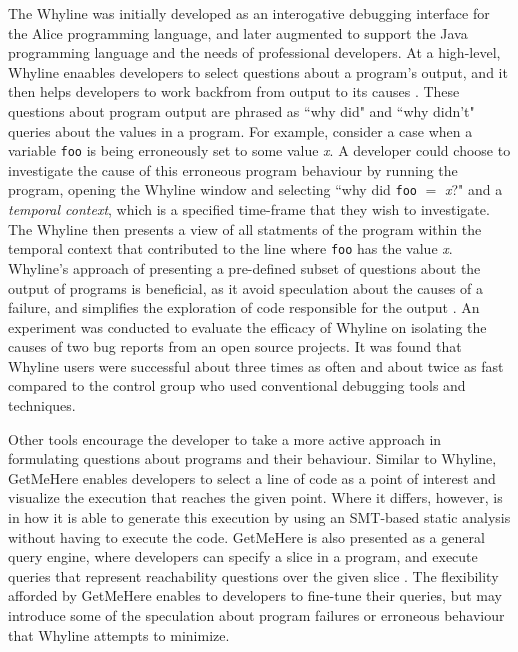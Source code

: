 \par The Whyline was initially developed as an interogative debugging interface
for the Alice programming language, and later augmented to support the Java
programming language and the needs of professional developers.
At a high-level, Whyline enaables developers to select questions about a
program's output, and it then helps developers to work backfrom from output
to its causes \cite{ko-2009-java-whyline}.
These questions about program output are phrased as ``why did" and ``why didn't"
queries about the values in a program. 
For example, consider a case when a variable \texttt{foo} is being erroneously 
set to some value \textit{x}.
A developer could choose to investigate the cause of this erroneous program
behaviour by running the program, opening the Whyline window and selecting
``why did \texttt{foo} $=$ \textit{x}?" and a \emph{temporal context}, which is 
 a specified time-frame that they wish to investigate.
The Whyline then presents a view of all statments of the program within the
temporal context that contributed to the line where \texttt{foo} has the value
\textit{x}. 
Whyline's approach of presenting a pre-defined subset of questions about the 
output of programs is beneficial, as it avoid speculation about the causes of
a failure, and simplifies the exploration of code responsible for the output
\cite{ko-2009-java-whyline}.
An experiment was conducted to evaluate the efficacy of Whyline on isolating the
causes of two bug reports from an open source projects.
It was found that Whyline users were successful about three times as often
and about twice as fast compared to the control group who used conventional
debugging tools and techniques.

\par Other tools encourage the developer to take a more active approach in
formulating questions about programs and their behaviour.
Similar to Whyline, GetMeHere enables developers to select a line of code as a
point of interest and visualize the execution that reaches the given point.
Where it differs, however, is in how it is able to generate this execution
by using an SMT-based static analysis \cite{barnett-2014-get} without having to
execute the code.
GetMeHere is also presented as a general query engine, where developers can
specify a slice in a program, and execute queries that represent reachability
questions over the given slice \cite{barnett-2014-get}.
The flexibility afforded by GetMeHere enables to developers to fine-tune their
queries, but may introduce some of the speculation about program failures or
erroneous behaviour that Whyline attempts to minimize.


\endinput

Sillito paper shows that developers often select the incorrect tool/are not
aware of the tools they should use to find out answers to these questions.

